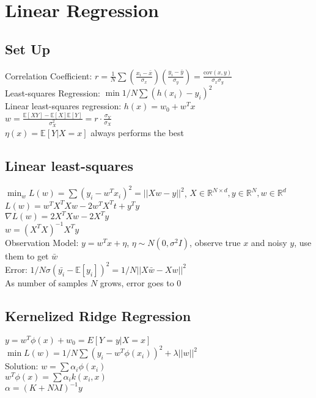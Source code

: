 \section{Linear Regression}

\subsection*{Set Up}

Correlation Coefficient: $r = \frac{1}{N} \sum \left(\frac{x_i-\bar{x}}{\sigma_x}\right)\left(\frac{y_i-\bar{y}}{\sigma_y}\right) = \frac{\text{cov}(x, y)}{\sigma_x \sigma_y}$\\
Least-squares Regression: $\min 1/N \sum(h(x_i) - y_i)^2$\\
Linear least-squares regression: $h(x) = w_0+ w^T x$\\
$w = \frac{\mathbb{E}[XY] - \mathbb{E}[X]\mathbb{E}[Y]}{\sigma_X^2} = r \cdot \frac{\sigma_Y}{\sigma_X}$\\
$\eta(x) = \mathbb{E}[Y|X = x]$ always performs the best\\

\subsection*{Linear least-squares}

$\min_w L(w) = \sum (y_i - w^T x_i)^2 = ||X w - y||^2$, $X \in \mathbb{R}^{N \times d}, y \in \mathbb{R}^N, w \in \mathbb{R}^d$\\
$L(w) = w^T X^T X w - 2 w^T X^T t + y^T y$\\
$\nabla L(w) = 2 X^T X w - 2 X^T y$\\
$w = (X^T X)^{-1} X^T y$\\
Observation Model: $y = w^T x + \eta$, $\eta \sim N(0, \sigma^2 I)$, observe true $x$ and noisy $y$, use them to get $\bar{w}$\\
Error: $1/N \sigma(\bar{y_i} - \mathbb{E}[y_i])^2 = 1/N ||X\bar{w} - Xw||^2$\\
As number of samples $N$ grows, error goes to 0

\subsection*{Kernelized Ridge Regression}

$y = w^T \phi(x) + w_0 = E[Y=y | X=x]$\\
$\min L(w) = 1/N \sum(y_i - w^T \phi(x_i))^2 + \lambda ||w||^2$\\
Solution: $w = \sum \alpha_i \phi(x_i)$\\
$w^T \phi(x) = \sum \alpha_i k(x_i, x)$\\
$\alpha = (K + N \lambda I)^{-1}y$\\

